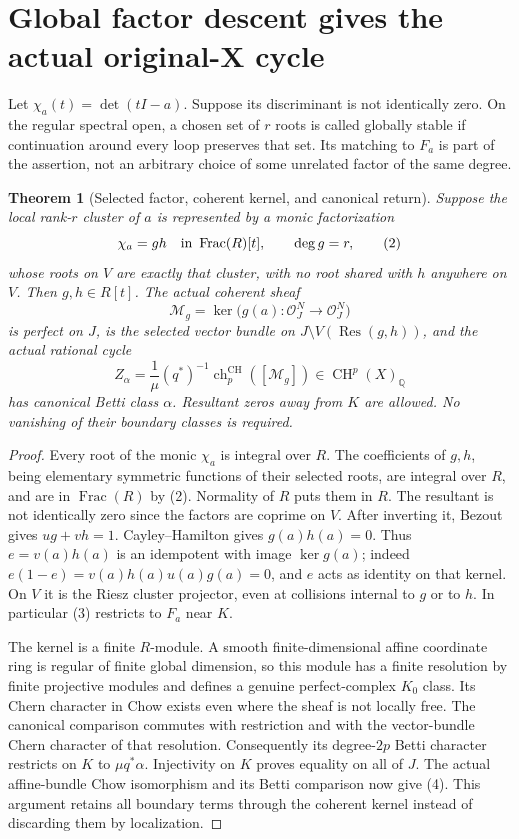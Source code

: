 \documentclass[11pt]{article}
\newtheorem{theorem}{Theorem}
\newcommand{\Q}{\mathbb Q}
\newcommand{\CH}{\operatorname{CH}}
\newcommand{\ch}{\operatorname{ch}}
\begin{document}
\section{Global factor descent gives the actual original-X cycle}
Let $\chi_a(t)=\det(tI-a)$. Suppose its discriminant is not identically
zero. On the regular spectral open, a chosen set of $r$ roots is called
globally stable if continuation around every loop preserves that set.
Its matching to $F_a$ is part of the assertion, not an arbitrary choice
of some unrelated factor of the same degree.

\begin{theorem}[Selected factor, coherent kernel, and canonical return]
Suppose the local rank-$r$ cluster of $a$ is represented by a monic
factorization
\[
 \chi_a=g h\quad\hbox{in }\operatorname{Frac}(R)[t],
 \qquad \deg g=r,                                      \tag{2}
\]
whose roots on $V$ are exactly that cluster, with no root shared with $h$
anywhere on $V$. Then $g,h\in R[t]$. The actual coherent sheaf
\[
 \mathcal M_g=\ker\bigl(g(a):\mathcal O_J^N\to\mathcal O_J^N\bigr)
                                                               \tag{3}
\]
is perfect on $J$, is the selected vector bundle on
$J\setminus V(\operatorname{Res}(g,h))$, and the actual rational cycle
\[
 Z_\alpha=\frac1\mu(q^*)^{-1}\ch_p^{\CH}([\mathcal M_g])
       \in\CH^p(X)_\Q                                  \tag{4}
\]
has canonical Betti class $\alpha$. Resultant zeros away from $K$ are
allowed. No vanishing of their boundary classes is required.
\end{theorem}
\begin{proof}
Every root of the monic $\chi_a$ is integral over $R$. The coefficients
of $g,h$, being elementary symmetric functions of their selected roots,
are integral over $R$, and are in $\operatorname{Frac}(R)$ by (2).
Normality of $R$ puts them in $R$. The resultant is not identically zero
since the factors are coprime on $V$. After inverting it, Bezout gives
$u g+v h=1$. Cayley--Hamilton gives $g(a)h(a)=0$. Thus
$e=v(a)h(a)$ is an idempotent with image $\ker g(a)$; indeed
$e(1-e)=v(a)h(a)u(a)g(a)=0$, and $e$ acts as identity on that kernel.
On $V$ it is the Riesz cluster projector, even at collisions internal
to $g$ or to $h$. In particular (3) restricts to $F_a$ near $K$.

The kernel is a finite $R$-module. A smooth finite-dimensional affine
coordinate ring is regular of finite global dimension, so this module
has a finite resolution by finite projective modules and defines a genuine
perfect-complex $K_0$ class. Its Chern character in Chow exists even where
the sheaf is not locally free. The canonical comparison commutes with
restriction and with the vector-bundle Chern character of that resolution.
Consequently its degree-$2p$ Betti character restricts on $K$ to
$\mu q^*\alpha$. Injectivity on $K$ proves equality on all of $J$.
The actual affine-bundle Chow isomorphism and its Betti comparison now
give (4). This argument retains all boundary terms through the coherent
kernel instead of discarding them by localization.
\end{proof}
\end{document}

